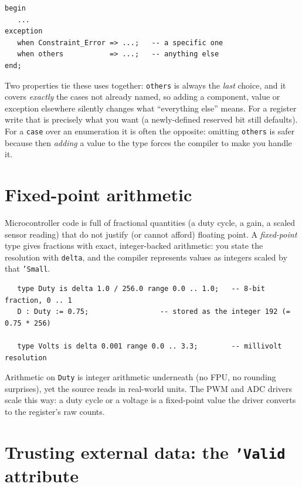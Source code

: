 \begin{lstlisting}
begin
   ...
exception
   when Constraint_Error => ...;   -- a specific one
   when others           => ...;   -- anything else
end;
\end{lstlisting}

Two properties tie these uses together: \texttt{others} is always the \emph{last}
choice, and it covers \emph{exactly} the cases not already named, so adding a
component, value or exception elsewhere silently changes what ``everything else''
means. For a register write that is precisely what you want (a newly-defined
reserved bit still defaults). For a \texttt{case} over an enumeration it is often
the opposite: omitting \texttt{others} is safer because then \emph{adding} a value
to the type forces the compiler to make you handle it.

\section{Fixed-point arithmetic}
\label{sec:fixed}

Microcontroller code is full of fractional quantities (a duty cycle, a gain, a
scaled sensor reading) that do not justify (or cannot afford) floating point.
A \emph{fixed-point} type gives fractions with exact, integer-backed arithmetic:
you state the resolution with \texttt{delta}, and the compiler represents values
as integers scaled by that \texttt{'Small}.

\begin{lstlisting}
   type Duty is delta 1.0 / 256.0 range 0.0 .. 1.0;   -- 8-bit fraction, 0 .. 1
   D : Duty := 0.75;                 -- stored as the integer 192 (= 0.75 * 256)

   type Volts is delta 0.001 range 0.0 .. 3.3;        -- millivolt resolution
\end{lstlisting}

Arithmetic on \texttt{Duty} is integer arithmetic underneath (no FPU, no
rounding surprises), yet the source reads in real-world units. The PWM and ADC
drivers scale this way: a duty cycle or a voltage is a fixed-point value the
driver converts to the register's raw counts.

\section{Trusting external data: the \texttt{'Valid} attribute}
\label{sec:valid}

